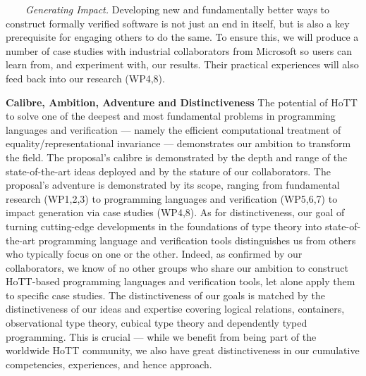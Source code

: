 \documentclass[a4paper,11pt]{article}
\begin{document}
  $\;\;\;\;\;\;$ {\em Generating Impact.} Developing new and
  fundamentally better ways to construct formally verified software is
  not just an end in itself, but is also a key prerequisite for
  engaging others to do the same.  To ensure this, we will produce a
  number of case studies with industrial collaborators from Microsoft so users can
  learn from, and experiment with, our results. Their practical
  experiences will also feed back into our research (WP4,8).

  {\bf Calibre, Ambition, Adventure and Distinctiveness} The potential
  of HoTT to solve one of the deepest and most fundamental problems in
  programming languages and verification --- namely the efficient
  computational treatment of equality/representational invariance ---
  demonstrates our ambition to transform the field. The proposal's
  calibre is demonstrated by the depth and range of the
  state-of-the-art ideas deployed and by the stature of our
  collaborators. The proposal's adventure is demonstrated by its
  scope, ranging from fundamental research (WP1,2,3) to programming
  languages and verification (WP5,6,7) to impact generation via case
  studies (WP4,8).  As for distinctiveness, our goal of turning
  cutting-edge developments in the foundations of type theory into
  state-of-the-art programming language and verification tools
  distinguishes us from others who typically focus on one or the
  other. Indeed, as confirmed by our collaborators, we know of no
  other groups who share our ambition to construct HoTT-based
  programming languages and verification tools, let alone apply them
  to specific case studies.  The distinctiveness of our goals is
  matched by the distinctiveness of our ideas and expertise covering
  logical relations, containers, observational type theory, cubical
  type theory and dependently typed programming. This is crucial ---
  while we benefit from being part of the worldwide HoTT community, we
  also have great distinctiveness in our cumulative competencies,
  experiences, and hence approach.

\vspace*{-0.1in} 

 
\end{document}
